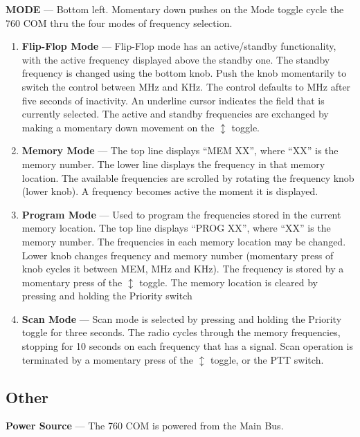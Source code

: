 \textbf{MODE} --- Bottom left. Momentary down pushes on the Mode toggle cycle the 760 COM thru the four modes of frequency selection. 
\begin{enumerate}
\item \textbf{Flip-Flop Mode} --- Flip-Flop mode has an active/standby functionality, with the active frequency displayed above the standby one. The standby frequency is changed using the bottom knob. Push the knob momentarily to switch the control between MHz and KHz. The control defaults to MHz after five seconds of inactivity. An underline cursor indicates the field that is currently selected. The active and standby frequencies are exchanged by making a momentary down movement on the $\updownarrow$ toggle. 
\item \textbf{Memory Mode} --- The top line displays ``MEM XX'', where ``XX'' is the memory number. The lower line displays the frequency in that memory location. The available frequencies are scrolled by rotating the frequency knob (lower knob). A frequency becomes active the moment it is displayed. 
\item \textbf{Program Mode} --- Used to program the frequencies stored in the current memory location. The top line displays ``PROG XX'', where ``XX'' is the memory number. The frequencies in each memory location may be changed. Lower knob changes frequency and memory number (momentary press of knob cycles it between MEM, MHz and KHz). The frequency is stored by a momentary press of the $\updownarrow$ toggle. The memory location is cleared by pressing and holding the Priority switch 
\item \textbf{Scan Mode} --- Scan mode is selected by pressing and holding the Priority toggle for three seconds. The radio cycles through the memory frequencies, stopping for 10 seconds on each frequency that has a signal. Scan operation is terminated by a momentary press of the $\updownarrow$ toggle, or the PTT switch. 
\end{enumerate}

\subsection*{Other}

\textbf{Power Source} --- The 760 COM is powered from the Main Bus.

